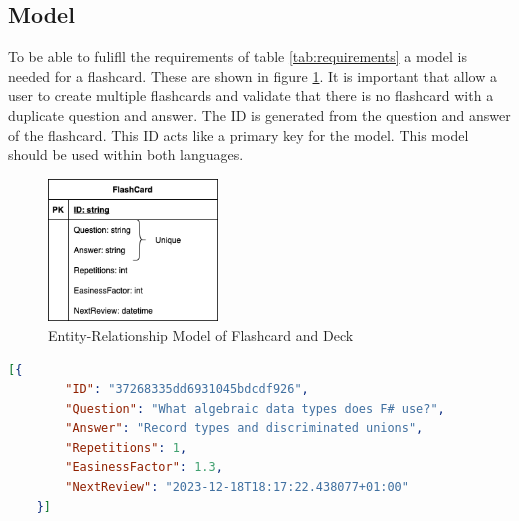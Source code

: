     \subsection{Model}
    To be able to fulifll the requirements of table \ref{tab:requirements} a model is needed for a flashcard. These are shown in figure \ref{fig:model}. It is important that allow a user to create multiple flashcards and validate that there is no flashcard with a duplicate question and answer. The ID is generated from the question and answer of the flashcard. This ID acts like a primary key for the model. This model should be used within both languages.

    \begin{figure}
        \centering
        \includegraphics[width=0.4\textwidth]{NerddeckModel.png}
        \caption{Entity-Relationship Model of Flashcard and Deck}
        \label{fig:model}
    \end{figure}

    \begin{lstlisting}[language=json,firstnumber=1,float=tp, caption={Example of how a flashcard is saved inside a \ac{json} file}, label=l:flashcardjson]
    [{
        "ID": "37268335dd6931045bdcdf926",
        "Question": "What algebraic data types does F# use?",
        "Answer": "Record types and discriminated unions",
        "Repetitions": 1,
        "EasinessFactor": 1.3,
        "NextReview": "2023-12-18T18:17:22.438077+01:00"
    }]   
    \end{lstlisting}

